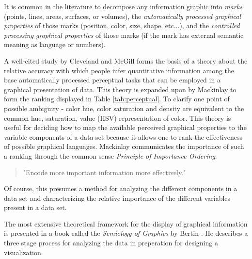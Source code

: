 It is common in the literature to decompose any information graphic into \emph{marks} (points, lines, areas, surfaces, or volumes), the \emph{automatically processed graphical properties} of those marks (position, color, size, shape, etc...), and the \emph{controlled processing graphical properties} of those marks (if the mark has external semantic meaning as language or numbers). 

A well-cited study by Cleveland and McGill \cite{cleveland1984} forms the basis of a theory about the relative accuracy with which people infer quantitative information among the base automatically processed perceptual tasks that can be employed in a graphical presentation of data. This theory is expanded upon by Mackinlay \cite{jock1986} to form the ranking displayed in Table \ref{tab:perceptual}. To clarify one point of possible ambiguity - color hue, color saturation and density are equivalent to the common hue, saturation, value (HSV) representation of color. This theory is useful for deciding how to map the available perceived graphical properties to the variable components of a data set because it allows one to rank the effectiveness of possible graphical languages. Mackinlay communicates the importance of such a ranking through the common sense \emph{Principle of Importance Ordering}:

\begin{quote}
"Encode more important information more effectively." \cite{jock1986}
\end{quote}

\begin{comment}
The Structure of the Information Visualization Design Space, Section 2 
controlled vs. automatic processing
connection

Visual Information Seeking: Tight Coupling of Dynamic Query Filters with Starfield Displays
\end{comment}

Of course, this presumes a method for analyzing the different components in a data set and characterizing the relative importance of the different variables present in a data set.

The most extensive theoretical framework for the display of graphical information is presented in a book called the \emph{Semiology of Graphics} by Bertin \cite{semiology1983}. He describes a three stage process for analyzing the data in preperation for designing a visualization.

